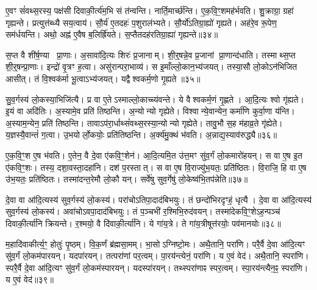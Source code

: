 ए॒वꣳ सं॑वथ्स॒रस्य॒ पक्ष॑सी दिवाकी॒र्त्य॑म॒भि सं त॑न्वन्ति।
नार्ति॒मार्च्छ॑न्ति।
ए॒क॒वि॒ꣳ॒शमह॑र्भवति।
शु॒क्राग्रा॒ ग्रहा॑ गृह्यन्ते।
प्रत्युत्त॑ब्ध्यै सय॒त्वाय॑।
सौ॒र्य॑ ए॒तदहः॑ प॒शुराल॑भ्यते।
सौ॒र्यो॑\-ऽतिग्रा॒ह्यो॑ गृह्यते।
अह॑रे॒व रू॒पेण॒ सम॑र्धयन्ति।
अथो॒ अह्न॑ ए॒वैष ब॒लिर्\mbox{}ह्रि॑यते।
स॒प्तैतदह॑रतिग्रा॒ह्या॑ गृह्यन्ते॥३४॥

स॒प्त वै शी॑र्\mbox{}ष॒ण्या प्रा॒णाः।
अ॒सावा॑दि॒त्यः शिरः॑ प्र॒जानाम्।
शी॒र्॒षन्ने॒व प्र॒जानां प्रा॒णान्द॑धाति।
तस्माथ्स॒प्त शी॒र्॒षन्प्रा॒णाः।
इन्द्रो॑ वृ॒त्रꣳ ह॒त्वा।
असु॑रान्परा॒भाव्य॑।
स इ॒माँल्लो॒कान॒भ्य॑जयत्।
तस्या॒सौ लो॒को\-ऽन॑भिजित आसीत्।
तं वि॒श्वक॑र्मा भू॒त्वा\-ऽभ्य॑जयत्।
यद्वैश्वकर्म॒णो गृ॒ह्यते॥३५॥

सु॒व॒र्गस्य॑ लो॒कस्या॒भिजि॑त्यै।
प्र वा ए॒ते\-ऽस्माल्लो॒काच्च्य॑वन्ते।
ये वैश्वकर्म॒णं गृ॒ह्णते।
आ॒दि॒त्यः श्वो गृ॑ह्यते।
इ॒यं वा अदि॑तिः।
अ॒स्यामे॒व प्रति॑ तिष्ठन्ति।
अ॒न्योन्यो गृह्येते।
विश्वान्ये॒वान्येन॒ कर्मा॑णि कुर्वा॒णा य॑न्ति।
अ॒स्याम॒न्येन॒ प्रति॑ तिष्ठन्ति।
तावाऽप॑रा॒र्धाथ्सं॑वथ्स॒रस्या॒न्योन्यो गृह्येते।
तावु॒भौ स॒ह म॑हाव्र॒ते गृ॑ह्येते।
य॒ज्ञस्यै॒वान्तं॑ ग॒त्वा।
उ॒भयोर्लो॒कयोः॒ प्रति॑तिष्ठन्ति।
अ॒र्क्य॑मु॒क्थं भ॑वति।
अ॒न्नाद्य॒स्याव॑रुद्ध्यै॥३६॥\anuvakamend[स॒मा॒यच्छ॑त्यतिग्रा॒ह्या॑ गृह्यन्ते गृ॒ह्यते॑ संवथ्स॒रस्या॒न्योन्यो गृह्येते॒ पञ्च॑ च]

ए॒क॒वि॒ꣳ॒श ए॒ष भ॑वति।
ए॒तेन॒ वै दे॒वा ए॑कवि॒ꣳ॒शेन॑।
आ॒दि॒त्यमि॒त उ॑त्त॒मꣳ सु॑व॒र्गं लो॒कमारो॑हयन्।
स वा ए॒ष इ॒त ए॑कवि॒ꣳ॒शः।
तस्य॒ दशा॒वस्ता॒दहा॑नि।
दश॑ प॒रस्तात्।
स वा ए॒ष वि॒राज्यु॑भ॒यतः॒ प्रति॑ष्ठितः।
वि॒राजि॒ हि वा ए॒ष उ॑भ॒यतः॒ प्रति॑ष्ठितः।
तस्मा॑दन्त॒रेमौ लो॒कौ यन्।
सर्वे॑षु सुव॒र्गेषु॑ लो॒केष्व॑भि॒तप॑न्नेति॥३७॥

दे॒वा वा आ॑दि॒त्यस्य॑ सुव॒र्गस्य॑ लो॒कस्य॑।
परा॑चो\-ऽतिपा॒दा\-द॑बिभयुः।
तं छन्दो॑भिरदृꣳहं॒ धृत्यै।
दे॒वा वा आ॑दि॒त्यस्य॑ सुव॒र्गस्य॑ लो॒कस्य॑।
अवा॑चो\-ऽवपा॒दाद॑बिभयुः।
तं प॒ञ्चभी॑ र॒श्मिभि॒रुद॑वयन्।
तस्मा॑देकवि॒ꣳ॒शे\-ऽह॒न्पञ्च॑ दिवाकी॒र्त्या॑नि क्रियन्ते।
र॒श्मयो॒ वै दि॑वाकी॒र्त्या॑नि।
ये गा॑य॒त्रे।
ते गा॑य॒त्रीषूत्त॑रयोः॒ पव॑मानयोः॥३८॥

म॒हादि॑वाकीर्त्य॒ꣳ॒ होतुः॑ पृ॒ष्ठम्।
वि॒क॒र्णं ब्र॑ह्मसा॒मम्।
भा॒सो\-ऽग्निष्टो॒मः।
अथै॒तानि॒ परा॑णि।
परै॒र्वै दे॒वा आ॑दि॒त्यꣳ सु॑व॒र्गं लो॒कम॑पारयन्।
यदपा॑रयन्।
तत्परा॑णां पर॒त्वम्।
पा॒रय॑न्त्येनं॒ परा॑णि।
य ए॒वं वेद॑।
अथै॒तानि॒ स्परा॑णि।
स्परै॒र्वै दे॒वा आ॑दि॒त्यꣳ सु॑व॒र्गं लो॒कम॑स्पारयन्।
यदस्पा॑रयन्।
तथ्स्परा॑णाꣴ स्पर॒त्वम्।
स्पा॒रय॑न्त्यैन॒ꣴ॒ स्परा॑णि।
य ए॒वं वेद॑॥३९॥\anuvakamend[ए॒ति॒ पव॑मानयोः॒ स्परा॑णि॒ पञ्च॑ च]

